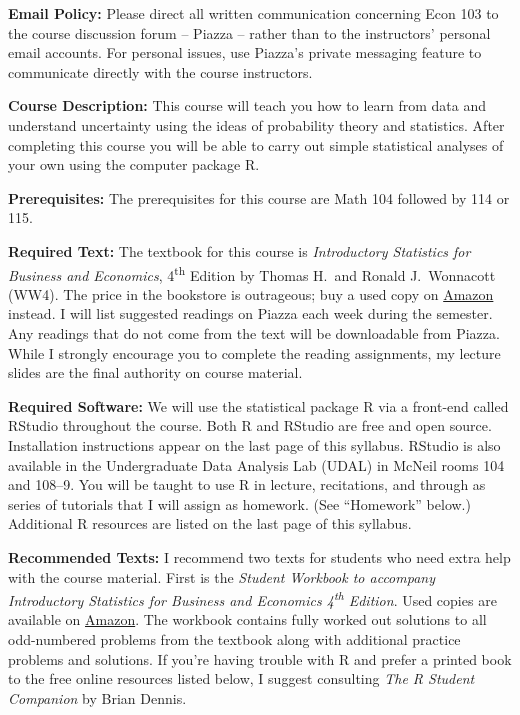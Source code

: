\documentclass[11pt, letterpaper]{article}
\begin{document}
\noindent \textbf{Email Policy:}
Please direct all written communication concerning Econ 103 to the course discussion forum -- Piazza -- rather than to the instructors' personal email accounts.
For personal issues, use Piazza's private messaging feature to communicate directly with the course instructors. 

\medskip



\noindent \textbf{Course Description:} 
This course will teach you how to learn from data and understand uncertainty using the ideas of probability theory and statistics. 
After completing this course you will be able to carry out simple statistical analyses of your own using the computer package R.


\medskip


\noindent \textbf{Prerequisites:} 
The prerequisites for this course are Math 104 followed by 114 or 115. 



\medskip

\noindent \textbf{Required Text:} 
The textbook for this course is \emph{Introductory Statistics for Business and Economics}, 4\textsuperscript{th} Edition by Thomas H.\ and Ronald J.\ Wonnacott (WW4). 
The price in the bookstore is outrageous; buy a used copy on \href{http://tinyurl.com/ECON103-2013A}{Amazon} instead. 
I will list suggested readings on Piazza each week during the semester.
Any readings that do not come from the text will be downloadable from Piazza.
While I strongly encourage you to complete the reading assignments, my lecture slides are the final authority on course material.

\medskip


\noindent \textbf{Required Software:} 
We will use the statistical package R via a front-end called RStudio throughout the course. 
Both R and RStudio are free and open source. Installation instructions appear on the last page of this syllabus.
RStudio is also available in the Undergraduate Data Analysis Lab (UDAL) in McNeil rooms 104 and 108--9. 
You will be taught to use R in lecture, recitations, and through as series of tutorials that I will assign as homework. (See ``Homework'' below.)  
Additional R resources are listed on the last page of this syllabus.

\medskip

\noindent \textbf{Recommended Texts:} 
I recommend two texts for students who need extra help with the course material. 
First is the \emph{Student Workbook to accompany Introductory Statistics for Business and Economics 4\textsuperscript{th} Edition}. 
Used copies are available on \href{http://www.amazon.com/gp/offer-listing/0471508993/sr=/qid=/ref=olp_page_2?ie=UTF8&colid=&coliid=&condition=all&me=&qid=&shipPromoFilter=0&sort=sip&sr=&startIndex=10}{Amazon}. 
The workbook contains fully worked out solutions to all odd-numbered problems from the textbook along with additional practice problems and solutions.
If you're having trouble with R and prefer a printed book to the free online resources listed below, I suggest consulting \emph{The R Student Companion} by Brian Dennis.
\end{document}
